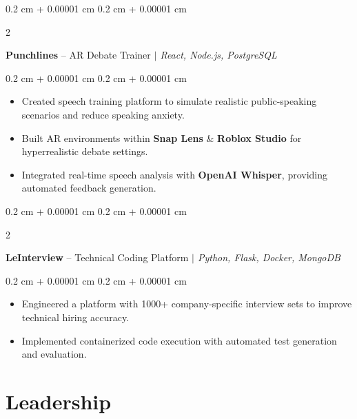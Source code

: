 \documentclass[10pt, letterpaper]{article}
\newenvironment{highlights}{
    \begin{itemize}[
        topsep=0.10 cm,
        parsep=0.10 cm,
        partopsep=0pt,
        itemsep=0pt,
        leftmargin=0.4 cm + 10pt
    ]
}{
    \end{itemize}
} %
\newenvironment{onecolentry}{
    \begin{adjustwidth}{
        0.2 cm + 0.00001 cm
    }{
        0.2 cm + 0.00001 cm
    }
}{
    \end{adjustwidth}
} %
\newenvironment{twocolentry}[2][]{
    \onecolentry
    \def\secondColumn{#2}
    \setcolumnwidth{\fill, 5 cm}
    \begin{paracol}{2}
}{
    \switchcolumn \raggedleft \secondColumn
    \end{paracol}
    \endonecolentry
} %
\let\hrefWithoutArrow\href
\renewcommand{\href}[2]{\hrefWithoutArrow{#1}{\ifthenelse{\equal{#2}{}}{ }{#2 }\raisebox{.15ex}{\footnotesize \faExternalLink*}}}
\begin{document}
        \vspace{0.3 cm}

        \begin{twocolentry}{}
            \textbf{Punchlines} -- AR Debate Trainer \textit{ $|$ React, Node.js, PostgreSQL}
        \end{twocolentry}

        \vspace{0.10 cm}
        \begin{onecolentry}
            \begin{highlights}
                \item Created speech training platform to simulate realistic public-speaking scenarios and reduce speaking anxiety.
                \item Built AR environments within \textbf{Snap Lens} \& \textbf{Roblox Studio} for hyperrealistic debate settings.
                \item Integrated real-time speech analysis with \textbf{OpenAI Whisper}, providing automated feedback generation.
            \end{highlights}
        \end{onecolentry}


        \vspace{0.3 cm}

        \begin{twocolentry}{}
            \textbf{LeInterview} -- Technical Coding Platform \textit{ $|$ Python, Flask, Docker, MongoDB}
        \end{twocolentry}

        \vspace{0.10 cm}
        \begin{onecolentry}
            \begin{highlights}
                \item Engineered a platform with 1000+ company-specific interview sets to improve technical hiring accuracy.
                \item Implemented containerized code execution with automated test generation and evaluation.
            \end{highlights}
        \end{onecolentry}


    \section{Leadership}
\end{document}
